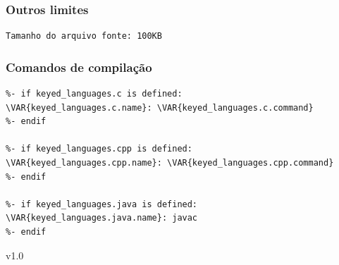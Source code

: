 \documentclass{article}
\begin{document}
\begin{titlepage}
\subsubsection*{Outros limites}
\begin{verbatim}
Tamanho do arquivo fonte: 100KB
\end{verbatim}

\subsubsection*{Comandos de compilação}
\begin{verbatim}
%- if keyed_languages.c is defined:
\VAR{keyed_languages.c.name}: \VAR{keyed_languages.c.command}
%- endif

%- if keyed_languages.cpp is defined:
\VAR{keyed_languages.cpp.name}: \VAR{keyed_languages.cpp.command}
%- endif

%- if keyed_languages.java is defined:
\VAR{keyed_languages.java.name}: javac
%- endif
\end{verbatim}


\vfill
\begin{center}
{\tiny v1.0}
\end{center}
\end{titlepage}
\end{document}
